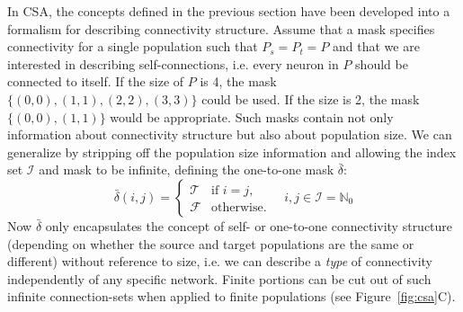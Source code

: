 \documentclass{frontiersSCNS} %
\newcommand{\Figure}[2]{Figure~\ref{#2}}
\newcommand{\Figure}[2]{Figure~#1}
\begin{document}
In CSA, the concepts defined in the previous section have been
developed into a formalism for describing connectivity structure.
Assume that a mask specifies connectivity for a single population such
that $P_s = P_t = P$ and that we are interested in describing
self-connections, i.e. every neuron in $P$ should be connected to
itself.  If the size of $P$ is 4, the mask $\{(0, 0), (1, 1), (2, 2),
(3, 3)\}$ could be used.  If the size is 2, the mask $\{(0, 0), (1,
1)\}$ would be appropriate. Such masks contain not only information
about connectivity structure but also about population size. We can
generalize by stripping off the population size information and
allowing the index set $\mathcal{I}$ and mask to be infinite, defining
the one-to-one mask $\bar{\delta}$:
\begin{equation*}
  \bar{\delta}(i, j) =
      \begin{cases}
        \mathcal{T}& \text{if $i = j$},\\
        \mathcal{F}& \text{otherwise}.
      \end{cases}
      \quad i, j \in \mathcal{I} = \mathbb{N}_0
\end{equation*}
Now $\bar{\delta}$ only encapsulates the concept of self- or
one-to-one connectivity structure (depending on whether the source and
target populations are the same or different) without reference to
size, i.e. we can describe a \emph{type} of connectivity independently
of any specific network.  Finite portions can be cut out of such
infinite connection-sets when applied to finite populations (see
\Figure{1}{fig:csa}C).
\end{document}
